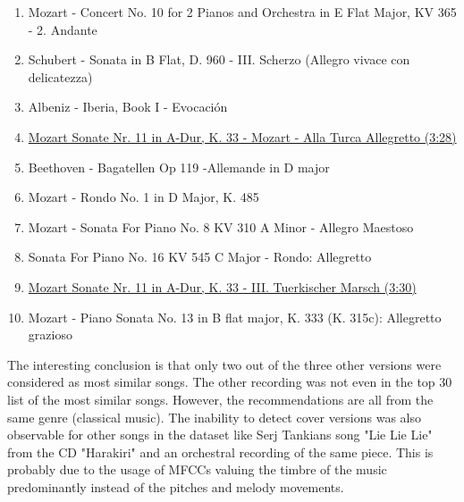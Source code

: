 \begin{enumerate}
	\setlength\itemsep{-0.5em}
	\item Mozart - Concert No. 10 for 2 Pianos and Orchestra in E Flat Major, KV 365 - 2. Andante
	\item Schubert - Sonata in B Flat, D. 960 - III. Scherzo (Allegro vivace con delicatezza)
	\item Albeniz - Iberia, Book I - Evocaci\'on
	\item \underline{Mozart Sonate Nr. 11 in A-Dur, K. 33 - Mozart - Alla Turca Allegretto (3:28)}
	\item Beethoven - Bagatellen Op 119 -Allemande in D major
	\item Mozart - Rondo No. 1 in D Major, K. 485
	\item Mozart - Sonata For Piano No. 8 KV 310 A Minor - Allegro Maestoso
	\item Sonata For Piano No. 16 KV 545 C Major - Rondo: Allegretto
	\item \underline{Mozart Sonate Nr. 11 in A-Dur, K. 33 - III. Tuerkischer Marsch (3:30)}
	\item Mozart - Piano Sonata No. 13 in B flat major, K. 333 (K. 315c): Allegretto grazioso
	
\end{enumerate}
\noindent The interesting conclusion is that only two out of the three other versions were considered as most similar songs. The other recording was not even in the top 30 list of the most similar songs. However, the recommendations are all from the same genre (classical music). The inability to detect cover versions was also observable for other songs in the dataset like Serj Tankians song "Lie Lie Lie" from the CD "Harakiri" and an orchestral recording of the same piece. This is probably due to the usage of MFCCs valuing the timbre of the music predominantly instead of the pitches and melody movements. 

